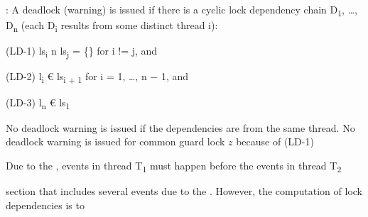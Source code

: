 \documentclass[landscape, a4paper]{article}
\begin{document}
\begin{minipage}[t]{0.19\linewidth}
\begin{betterlist}
		\adjustbox{scale=0.5}{
            \begin{dnumberedcodebox}[minted language=text,minted options={autogobble, fontsize=\Large}, box align=top]
            acq(t,y) {
                Ds = Ds U { (t,y,ls(t)) } if ls(t) != emptyset
                ls(t) = ls(t) U {y}
            }
            rel(t,y) {
                ls(t) = ls(t) \ {y}
            }
            fork(t1,t2) {
            }
            ...
            \end{dnumberedcodebox}
		}
		\item {}: A deadlock (warning) is issued if there is a cyclic lock dependency chain D\textsubscript{1}, \ldots, D\textsubscript{n} (each D\textsubscript{i} results from some distinct thread i):
		\begin{betterlist}
			\item (LD-1) ls\textsubscript{i} n ls\textsubscript{j} = \{\} for i != j, and
			\item (LD-2) l\textsubscript{i} € ls\textsubscript{i + 1} for i = 1, \ldots, n − 1, and
			\item (LD-3) l\textsubscript{n} € ls\textsubscript{1}
		\end{betterlist}
		\item {}
		\begin{betterlist}
			\item No deadlock warning is issued if the dependencies are from the same thread. No deadlock warning is issued for common guard lock $z$ because of (LD-1)
			\item {} Due to the , events in thread T\textsubscript{1} must happen before the events in thread T\textsubscript{2}
			\item {}  section that includes several events due to the . However, the computation of lock dependencies is  to 
		\end{betterlist}
	\end{betterlist}


\end{minipage}
\end{document}
